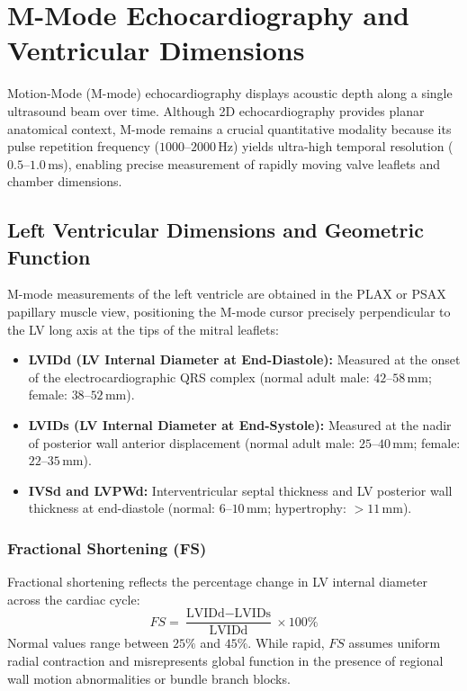 \documentclass[11pt,a4paper]{article}
\begin{document}
\newpage
\section{M-Mode Echocardiography and Ventricular Dimensions}

Motion-Mode (M-mode) echocardiography displays acoustic depth along a single ultrasound beam over time. Although 2D echocardiography provides planar anatomical context, M-mode remains a crucial quantitative modality because its pulse repetition frequency ($1000\text{--}2000\,\text{Hz}$) yields ultra-high temporal resolution ($0.5\text{--}1.0\,\text{ms}$), enabling precise measurement of rapidly moving valve leaflets and chamber dimensions.

\subsection{Left Ventricular Dimensions and Geometric Function}

M-mode measurements of the left ventricle are obtained in the PLAX or PSAX papillary muscle view, positioning the M-mode cursor precisely perpendicular to the LV long axis at the tips of the mitral leaflets:
\begin{itemize}[leftmargin=*]
    \item \textbf{LVIDd (LV Internal Diameter at End-Diastole):} Measured at the onset of the electrocardiographic QRS complex (normal adult male: $42\text{--}58\,\text{mm}$; female: $38\text{--}52\,\text{mm}$).
    \item \textbf{LVIDs (LV Internal Diameter at End-Systole):} Measured at the nadir of posterior wall anterior displacement (normal adult male: $25\text{--}40\,\text{mm}$; female: $22\text{--}35\,\text{mm}$).
    \item \textbf{IVSd and LVPWd:} Interventricular septal thickness and LV posterior wall thickness at end-diastole (normal: $6\text{--}10\,\text{mm}$; hypertrophy: $> 11\,\text{mm}$).
\end{itemize}

\subsubsection{Fractional Shortening (FS)}
Fractional shortening reflects the percentage change in LV internal diameter across the cardiac cycle:
\begin{equation}
    FS = \frac{\text{LVIDd} - \text{LVIDs}}{\text{LVIDd}} \times 100\%
\end{equation}
Normal values range between $25\%$ and $45\%$. While rapid, $FS$ assumes uniform radial contraction and misrepresents global function in the presence of regional wall motion abnormalities or bundle branch blocks.
\end{document}
